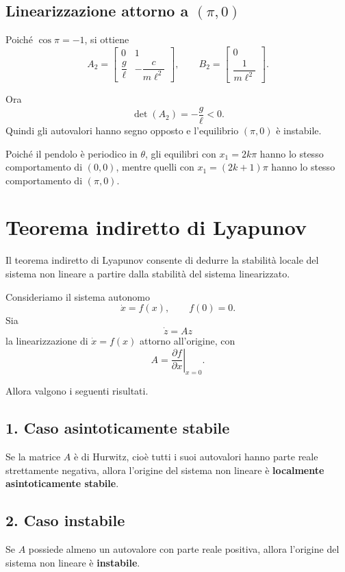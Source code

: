\subsection{Linearizzazione attorno a \((\pi,0)\)}
Poiché \(\cos \pi=-1\), si ottiene
\[
A_2=
\begin{bmatrix}
0 & 1\\[0.1cm]
\dfrac{g}{\ell} & -\dfrac{c}{m\ell^2}
\end{bmatrix},
\qquad
B_2=
\begin{bmatrix}
0\\[0.1cm]
\dfrac{1}{m\ell^2}
\end{bmatrix}.
\]

Ora
\[
\det(A_2)=-\frac{g}{\ell}<0.
\]
Quindi gli autovalori hanno segno opposto e l'equilibrio \((\pi,0)\) è instabile.

\medskip

\noindent
Poiché il pendolo è periodico in \(\theta\), gli equilibri con \(x_1=2k\pi\) hanno lo stesso comportamento di \((0,0)\), mentre quelli con \(x_1=(2k+1)\pi\) hanno lo stesso comportamento di \((\pi,0)\).

\bigskip

\section{Teorema indiretto di Lyapunov}

Il teorema indiretto di Lyapunov consente di dedurre la stabilità locale del sistema non lineare a partire dalla stabilità del sistema linearizzato.

Consideriamo il sistema autonomo
\[
\dot x=f(x),
\qquad
f(0)=0.
\]
Sia
\[
\dot z = Az
\]
la linearizzazione di \(\dot x=f(x)\) attorno all'origine, con
\[
A=\left.\frac{\partial f}{\partial x}\right|_{x=0}.
\]

Allora valgono i seguenti risultati.

\subsection*{1. Caso asintoticamente stabile}
Se la matrice \(A\) è di Hurwitz, cioè tutti i suoi autovalori hanno parte reale strettamente negativa, allora l'origine del sistema non lineare è \textbf{localmente asintoticamente stabile}.

\subsection*{2. Caso instabile}
Se \(A\) possiede almeno un autovalore con parte reale positiva, allora l'origine del sistema non lineare è \textbf{instabile}.

